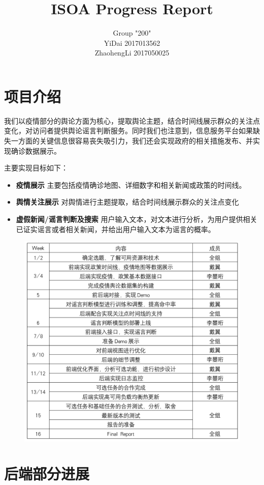 \documentclass{article}
\title{ISOA Progress Report}
\author{Group "200"\\YiDai 2017013562\\ZhaohengLi 2017050025}
\begin{document}
\maketitle
\section{项目介绍}
我们以疫情部分的舆论方面为核心，提取舆论主题，结合时间线展示群众的关注点变化，对访问者提供舆论谣言判断服务。同时我们也注意到，信息服务平台如果缺失一方面的关键信息很容易丧失吸引力，我们还会实现政府的相关措施发布、并实现确诊数据展示。

主要实现目标如下：
\begin{itemize}
	\item{\textbf{疫情展示}} 主要包括疫情确诊地图、详细数字和相关新闻或政策的时间线。
	\item{\textbf{舆情关注展示}} 对舆情进行主题提取，结合时间线展示群众的关注点变化
	\item{\textbf{虚假新闻/谣言判断及搜索}} 用户输入文本，对文本进行分析，为用户提供相关已证实谣言或者相关新闻，并给出用户输入文本为谣言的概率。
\end{itemize}

\begin{figure}[H]
\centering
\includegraphics[width=1\textwidth]{pic1.png}
\end{figure}

\section{后端部分进展}
\end{document}

